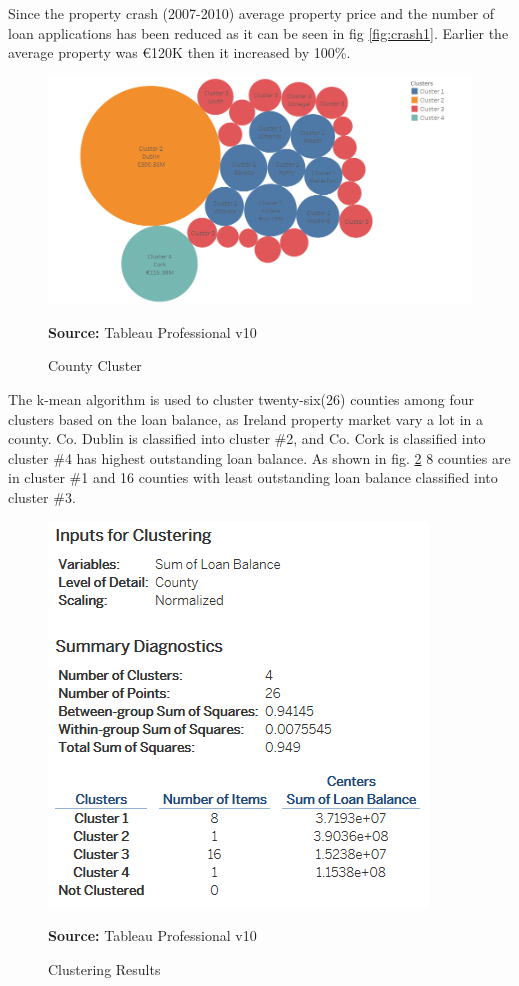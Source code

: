 Since the property crash (2007-2010) average property price and the number of loan applications has been reduced as it can be seen in fig \ref{fig:crash1}. Earlier the average property was \euro 120K then it increased by 100\%.

\begin{center}
\begin{figure}[!htb]
\includegraphics[scale=0.4]{clustero.png}
\centering
\caption{County Cluster}{\textbf{Source:} Tableau Professional v10}
\label{fig:clustero}
\end{figure}
\end{center}

The k-mean algorithm is used to cluster twenty-six(26) counties among four clusters based on the loan balance, as Ireland property market vary a lot in a county. Co. Dublin is classified into cluster \#2, and Co. Cork is classified into cluster \#4 has highest outstanding loan balance. As shown in fig. \ref{fig:cluster} 8 counties are in cluster \#1 and 16 counties with least outstanding loan balance classified into cluster \#3.

\begin{center}
\begin{figure}[!htb]
\includegraphics[scale=0.5]{cluster.png}
\centering
\caption{Clustering Results}{\textbf{Source:} Tableau Professional v10}
\label{fig:cluster}
\end{figure}
\end{center}

